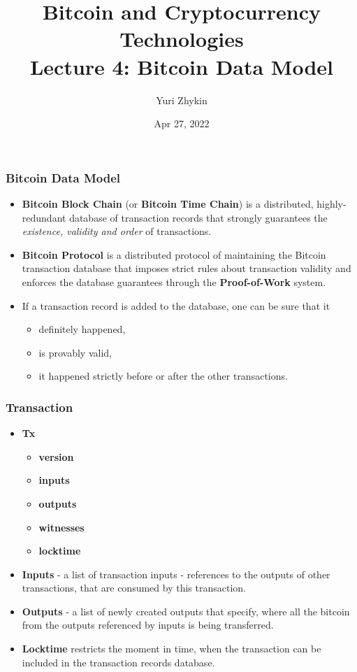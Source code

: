 \documentclass{beamer}
\title{
  Bitcoin and Cryptocurrency Technologies \\
  Lecture 4: Bitcoin Data Model
}
\author{Yuri Zhykin}
\date{Apr 27, 2022}
\begin{document}
\frame{\titlepage}

\begin{frame}
  \frametitle{Bitcoin Data Model}
  \begin{itemize}
  \item \textbf{Bitcoin Block Chain} (or \textbf{Bitcoin Time Chain}) is a
    distributed, highly-redundant database of transaction records that strongly
    guarantees the \textit{existence, validity and order} of transactions.
  \item \textbf{Bitcoin Protocol} is a distributed protocol of maintaining the
    Bitcoin transaction database that imposes strict rules about transaction
    validity and enforces the database guarantees through the
    \textbf{Proof-of-Work} system.
  \item If a transaction record is added to the database, one can be sure that
    it 
    \begin{itemize}
    \item definitely happened,
    \item is provably valid,
    \item it happened strictly before or after the other transactions.
    \end{itemize}
  \end{itemize}
\end{frame}

\begin{frame}
  \frametitle{Transaction}
  \begin{itemize}
  \item \textbf{Tx}
    \begin{itemize}
    \item \textbf{version}
    \item \textbf{inputs}
    \item \textbf{outputs}
    \item \textbf{witnesses}
    \item \textbf{locktime}
    \end{itemize}
  \item \textbf{Inputs} - a list of transaction inputs - references to the
    outputs of other transactions, that are consumed by this transaction.
  \item \textbf{Outputs} - a list of newly created outputs that specify, where
    all the bitcoin from the outputs referenced by inputs is being transferred.
  \item \textbf{Locktime} restricts the moment in time, when the transaction can
    be included in the transaction records database.
  \end{itemize}
\end{frame}
\end{document}
